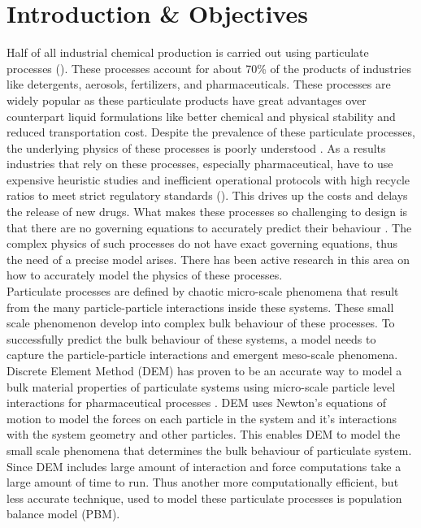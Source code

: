 \documentclass[preprint,11pt,authoryear]{elsarticle}
\begin{document}
\section{Introduction \& Objectives} 
Half of all industrial chemical production is carried out using particulate processes 
(\cite{seville1997}). These processes account for about 70\% of the products 
of industries like detergents, aerosols, fertilizers, and pharmaceuticals\citep{Litster2016}. 
These processes are widely popular as these particulate products have great advantages over 
counterpart liquid formulations like better chemical and physical stability and reduced 
transportation cost. Despite the prevalence of these particulate processes, the underlying 
physics of these processes is poorly understood \citep{Rogers2013}. As a results industries 
that rely on these processes, especially pharmaceutical, have to use expensive 
heuristic studies and inefficient operational protocols with high recycle ratios to meet strict 
regulatory standards (\cite{Ramachandran2009}). This drives up the costs and delays the release of 
new drugs. What makes these processes so challenging to design is that there are no governing 
equations to accurately predict their behaviour \citep{sen2013}. The complex physics of such 
processes do not have exact governing equations, thus the need of a precise model arises. There 
has been active research in this area on how to accurately model the  physics of these processes.\\
Particulate processes are defined by chaotic micro-scale phenomena that result from the many 
particle-particle interactions inside these systems. These small scale phenomenon develop into 
complex bulk behaviour of these processes. To successfully predict the bulk behaviour of these 
systems, a model needs to capture the particle-particle interactions and emergent meso-scale phenomena. Discrete Element Method (DEM)\citep{Cundall1979} has proven to be an accurate way 
to  model a bulk material properties of particulate systems using micro-scale particle level 
interactions for pharmaceutical processes \citep{Hancock2011}. DEM uses Newton's equations of 
motion to model the forces on each particle in the system and it's interactions with the system 
geometry and other particles. This enables DEM to model the small scale phenomena that 
determines the bulk behaviour of particulate system. Since DEM includes large amount of interaction 
and force computations take a large amount of time to run. Thus another more computationally 
efficient, but less accurate technique, used to model these particulate processes is population 
balance model (PBM).
\end{document}
